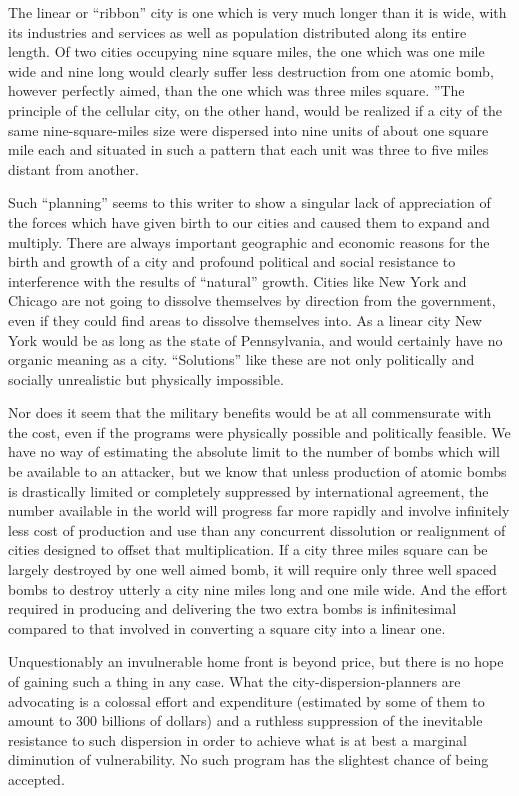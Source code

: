 The linear or ``ribbon'' city is one which is very much longer than it is wide, with its industries and services as well as population distributed along its entire length. Of two cities occupying nine square miles, the one which was one mile wide and nine long would clearly suffer less destruction from one atomic bomb, however perfectly aimed, than the one which was three miles square. ''The principle of the cellular city, on the other hand, would be realized if a city of the same nine-square-miles size were dispersed into nine units of about one square mile each and situated in such a pattern that each unit was three to five miles distant from another.

Such ``planning'' seems to this writer to show a singular lack of appreciation of the forces which have given birth to our cities and caused them to expand and multiply. There are always important geographic and economic reasons for the birth and growth of a city and profound political and social resistance to interference with the results of ``natural'' growth. Cities like New York and Chicago are not going to dissolve themselves by direction from the government, even if they could find areas to dissolve themselves into. As a linear city New York would be as long as the state of Pennsylvania, and would certainly have no organic meaning as a city. ``Solutions'' like these are not only politically and socially unrealistic but physically impossible.

Nor does it seem that the military benefits would be at all commensurate with the cost, even if the programs were physically possible and politically feasible. We have no way of estimating the absolute limit to the number of bombs which will be available to an attacker, but we know that unless production of atomic bombs is drastically limited or completely suppressed by international agreement, the number available in the world will progress far more rapidly and involve infinitely less cost of production and use than any concurrent dissolution or realignment of cities designed to offset that multiplication. If a city three miles square can be largely destroyed by one well aimed bomb, it will require only three well spaced bombs to destroy utterly a city nine miles long and one mile wide. And the effort required in producing and delivering the two extra bombs is infinitesimal compared to that involved in converting a square city into a linear one.

Unquestionably an invulnerable home front is beyond price, but there is no hope of gaining such a thing in any case. What the city-dispersion-planners are advocating is a colossal effort and expenditure (estimated by some of them to amount to 300 billions of dollars) and a ruthless suppression of the inevitable resistance to such dispersion in order to achieve what is at best a marginal diminution of vulnerability. No such program has the slightest chance of being accepted.

